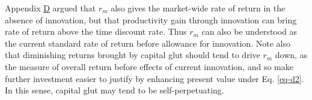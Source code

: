 \documentclass[a4padisinvitingper,fleqn]{latex_styles/cas-sc}
\begin{document}
Appendix \hyperref[appendix-d]{D} argued that \(r_m\) also gives the market-wide rate of return in the absence of innovation, but that productivity gain through innovation can bring rate of return above the time discount rate. Thus \(r_m\) can also be understood as the current standard rate of return before allowance for innovation. Note also that diminishing returns brought by capital glut should tend to drive \(r_m\) down, as the measure of overall return before effects of current innovation, and so make further investment easier to justify by enhancing present value under Eq. \eqref{eq-d2}. In this sense, capital glut may tend to be self-perpetuating.



\printcredits

% 



\end{document}
